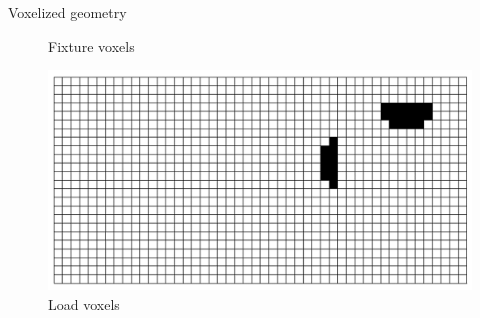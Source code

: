 \begin{frame}{Voxelized geometry}
\begin{minipage}{0.49\textwidth}
\begin{figure}
\vspace*{-2mm}
\caption{Fixture voxels}
\end{figure}
\vspace{-0.6cm}
\begin{figure}
\includegraphics[width=.7\textwidth]{Pictures/Voxels/Load.png}
\vspace*{-2mm}
\caption{Load voxels}
\end{figure}
\end{minipage}
\end{frame}

